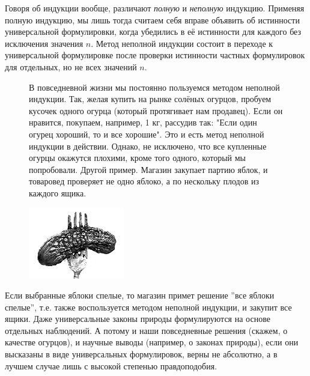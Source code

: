 Говоря об индукции вообще, различают \textit{полную} и \textit{неполную} индукцию. Применяя полную индукцию, мы лишь тогда считаем себя вправе объявить об истинности универсальной формулировки, когда убедились в её истинности для каждого без исключения значения $n$. Метод неполной индукции состоит в переходе к универсальной формулировке после проверки истинности частных формулировок для отдельных, но не всех
значений $n$.

\begin{figure}[H]
\begin{minipage}{0.69\linewidth}\setlength{\parindent}{1.5em}
В повседневной жизни мы постоянно пользуемся методом неполной
индукции. Так, желая купить на рынке солёных огурцов, пробуем кусочек одного огурца (который протягивает нам продавец). Если он нравится, покупаем, например, 1 кг, рассудив так: "Если один огурец хороший, то и все хорошие". Это и есть метод неполной индукции в действии. Однако, не исключено, что все купленные огурцы окажутся плохими, кроме того одного, который мы попробовали. Другой пример. Магазин закупает партию яблок, и товаровед проверяет не одно яблоко, а по нескольку плодов из каждого ящика. 
\end{minipage}
\hfill
\begin{minipage}{0.3\linewidth}
    \includegraphics[width=0.95\columnwidth]{img/ogurec.png}
\end{minipage}
\end{figure} 
\par
Если выбранные яблоки спелые, то магазин примет решение ''все яблоки спелые'', т.е. также воспользуется методом неполной индукции, и закупит все ящики. Даже универсальные законы природы формулируются на основе отдельных наблюдений. А потому и наши повседневные решения (скажем, о качестве огурцов), и научные выводы (например, о законах природы), если они высказаны в виде универсальных формулировок, верны не абсолютно, а в лучшем случае лишь с высокой степенью правдоподобия.
